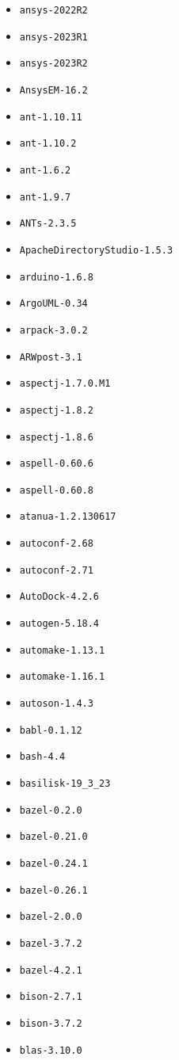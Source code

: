 \begin{itemize}
\item \verb|ansys-2022R2|
\item \verb|ansys-2023R1|
\item \verb|ansys-2023R2|
\item \verb|AnsysEM-16.2|
\item \verb|ant-1.10.11|
\item \verb|ant-1.10.2|
\item \verb|ant-1.6.2|
\item \verb|ant-1.9.7|
\item \verb|ANTs-2.3.5|
\item \verb|ApacheDirectoryStudio-1.5.3|
\item \verb|arduino-1.6.8|
\item \verb|ArgoUML-0.34|
\item \verb|arpack-3.0.2|
\item \verb|ARWpost-3.1|
\item \verb|aspectj-1.7.0.M1|
\item \verb|aspectj-1.8.2|
\item \verb|aspectj-1.8.6|
\item \verb|aspell-0.60.6|
\item \verb|aspell-0.60.8|
\item \verb|atanua-1.2.130617|
\item \verb|autoconf-2.68|
\item \verb|autoconf-2.71|
\item \verb|AutoDock-4.2.6|
\item \verb|autogen-5.18.4|
\item \verb|automake-1.13.1|
\item \verb|automake-1.16.1|
\item \verb|autoson-1.4.3|
\item \verb|babl-0.1.12|
\item \verb|bash-4.4|
\item \verb|basilisk-19_3_23|
\item \verb|bazel-0.2.0|
\item \verb|bazel-0.21.0|
\item \verb|bazel-0.24.1|
\item \verb|bazel-0.26.1|
\item \verb|bazel-2.0.0|
\item \verb|bazel-3.7.2|
\item \verb|bazel-4.2.1|
\item \verb|bison-2.7.1|
\item \verb|bison-3.7.2|
\item \verb|blas-3.10.0|

\end{itemize}
